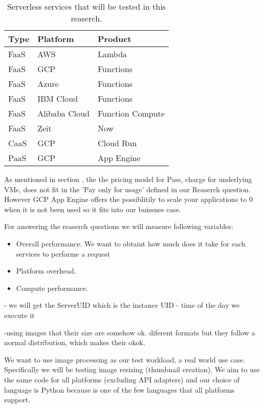 \documentclass[11pt]{article}
\begin{document}
\begin{table}
\centering
 \begin{tabularx}{\textwidth}{ X  X  X }
 \textbf{Type} & \textbf{Platform} & \textbf{Product} \\
 \hline
 \hline
 FaaS & AWS & Lambda \\
 \hline
 FaaS & GCP & Functions \\
 \hline
 FaaS & Azure & Functions \\
 \hline
 FaaS & IBM Cloud & Functions \\
 \hline
 FaaS & Alibaba Cloud & Function Compute \\
 \hline
 FaaS & Zeit & Now \\
 \hline
 CaaS & GCP & Cloud Run \\
 \hline
 PaaS & GCP & App Engine \\

\end{tabularx}
\caption{Serverless services that will be tested in this reaserch.}
\label{Tab:services}
\end{table}

As mentioned in section \label{introduction}, the the pricing model for Pass, charge for underlying VMs, does not fit in the 'Pay only for usage' defined in our Reaserch question. However GCP App Engine offers the possiblitily to scale your applications to 0 when it is not been used so it fits into our buissnes case.




For answering the reaserch questions we will measure following variables:

\begin{itemize}
\item Overall performance. We want to obtaint how much does it take for each services to performe a request
\item Platform overhead.
\item Compute performance.
\end{itemize}


- we will get the ServerUID which is the instance UID
- time of the day we execute it



-using images that their size are somehow ok. diferent formats but they follow a normal distribution, which makes their okok.

We want to use image processing as our test workload, a real world \cite{ii} use case. Specifically we will be testing image resizing (thumbnail creation). We aim to use the same code for all platforms (excluding API adapters) and our choice of language is Python because is one of the few languages that all platforms support.
\end{document}
